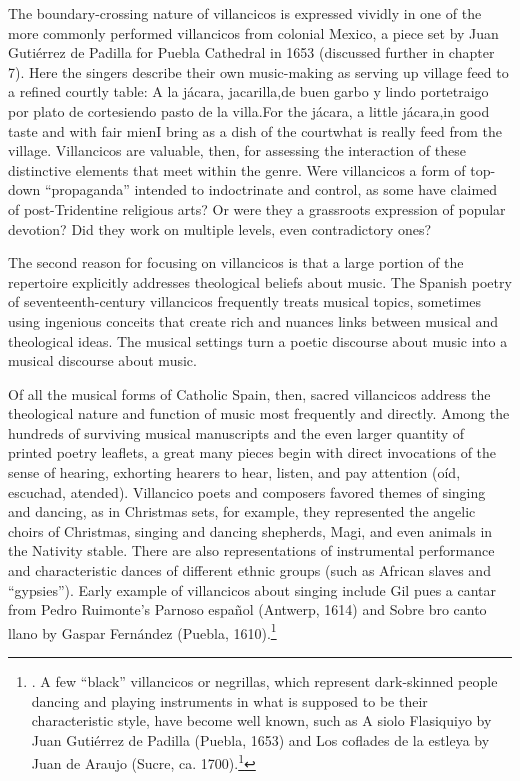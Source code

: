 \documentclass{memoir}
\begin{document}
{    The boundary-crossing nature of villancicos is expressed vividly in one of the more commonly performed villancicos from colonial Mexico, a piece set by Juan Gutiérrez de Padilla for Puebla Cathedral in 1653 (discussed further in chapter 7).
    Here the singers describe their own music-making as serving up village feed to a refined courtly table:
    A la jácara, jacarilla,de buen garbo y lindo portetraigo por plato de cortesiendo pasto de la villa.For the jácara, a little jácara,in good taste and with fair mienI bring as a dish of the courtwhat is really feed from the village.
    Villancicos are valuable, then, for assessing the interaction of these distinctive elements that meet within the genre.
    Were villancicos a form of top-down \enquote{propaganda} intended to indoctrinate and control, as some have claimed of post-Tridentine religious arts?
    Or were they a grassroots expression of popular devotion? 
    Did they work on multiple levels, even contradictory ones?
  
    The second reason for focusing on villancicos is that a large portion of the repertoire explicitly addresses theological beliefs about music.
    The Spanish poetry of seventeenth-century villancicos frequently treats musical topics, sometimes using ingenious conceits that create rich and nuances links between musical and theological ideas.
    The musical settings turn a poetic discourse about music into a musical discourse about music.
  
    Of all the musical forms of Catholic Spain, then, sacred villancicos address the theological nature and function of music most frequently and directly.
    Among the hundreds of surviving musical manuscripts and the even larger quantity of printed poetry leaflets, a great many pieces begin with direct invocations of the sense of hearing, exhorting hearers to hear, listen, and pay attention (oíd, escuchad, atended).
    Villancico poets and composers favored themes of singing and dancing, as in Christmas sets, for example, they represented the angelic choirs of Christmas, singing and dancing shepherds, Magi, and even animals in the Nativity stable.
    There are also representations of instrumental performance and characteristic dances of different ethnic groups (such as African slaves and \enquote{gypsies}).
    Early example of villancicos about singing include Gil pues a cantar from Pedro Ruimonte’s Parnoso español (Antwerp, 1614) and Sobre bro canto llano by Gaspar Fernández (Puebla, 1610).\footnote{%
      .
    A few \enquote{black} villancicos or negrillas, which represent dark-skinned people dancing and playing instruments in what is supposed to be their characteristic style, have become well known, such as A siolo Flasiquiyo by Juan Gutiérrez de Padilla (Puebla, 1653) and Los coflades de la estleya by Juan de Araujo (Sucre, ca. 1700).\footnote{%
      See chapter  for a discussion of A siolo Flasiquiyo and other \enquote{ethnic} villancicos.
      One of several recordings of the Araujo piece is .
    These pieces constitute \enquote{music about music}.
    If a play within a play in Spanish Golden Age drama may be termed metatheatrical, then these pieces are \enquote{metamusical}.
  
}}}
\end{document}
